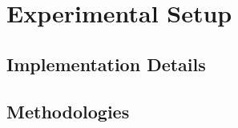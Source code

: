 \documentclass[../../main.tex]{subfiles}
\begin{document}
\section{Experimental Setup}

\subsection{Implementation Details}

\subsection{Methodologies}
\end{document}
